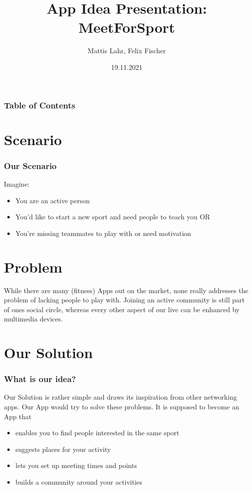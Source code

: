 \documentclass[aspectratio=169]{beamer}
\title{App Idea Presentation: MeetForSport}
\author{Mattis Lahr, Felix Fischer}
\date{19.11.2021}
\begin{document}
\maketitle



\begin{frame}
    \frametitle{Table of Contents}
    \tableofcontents
\end{frame}





\section{Scenario}
\begin{frame}   
\frametitle{Our Scenario}
Imagine:
    \begin{itemize}	
	 	\item You are an active person
	 	\item You'd like to start a new sport and need people to teach you OR
	 	\item You're missing teammates to play with or need motivation
    \end{itemize}
\end{frame}


\section{Problem}
\begin{frame}   
	While there are many (fitness) Apps out on the market, none really
	addresses the problem of lacking people to play with. Joining an active
	community is still part of ones social circle, whereas every other aspect of
	our live can be enhanced by multimedia devices.
	\end{frame}


\section{Our Solution}
\begin{frame}   
\frametitle{What is our idea?}
Our Solution is rather simple and draws its inspiration from other networking apps.
Our App would try to solve these problems. It is supposed to become an App that
    \begin{itemize}	
		\item enables you to find people interested in the same sport
	 	\item suggests places for your activity 
	 	\item lets you set up meeting times and points
	 	\item builds a community around your activities 
    \end{itemize}
\end{frame}
\end{document}
